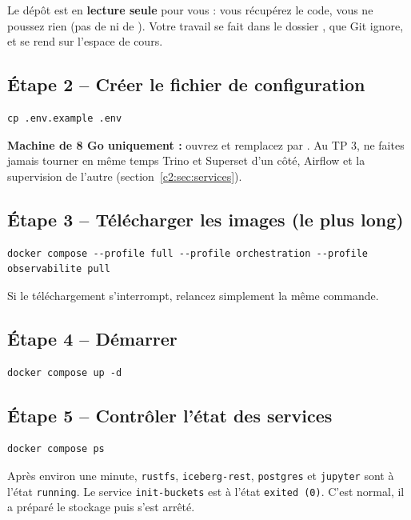 \begin{attention}
Le dépôt est en \textbf{lecture seule} pour vous : vous récupérez le code, vous ne poussez rien
(pas de  ni de ). Votre travail se fait dans le dossier
, que Git ignore, et se rend sur l'espace de cours.
\end{attention}

\subsection*{Étape 2 -- Créer le fichier de configuration}
\begin{lstlisting}[style=shell]
cp .env.example .env
\end{lstlisting}
\textbf{Machine de 8 Go uniquement :} ouvrez  et remplacez  par .
Au TP 3, ne faites jamais tourner en même temps Trino et Superset d'un côté, Airflow et la
supervision de l'autre (section~\ref{c2:sec:services}).

\subsection*{Étape 3 -- Télécharger les images (le plus long)}
\begin{lstlisting}[style=shell]
docker compose --profile full --profile orchestration --profile observabilite pull
\end{lstlisting}
Si le téléchargement s'interrompt, relancez simplement la même commande.

\subsection*{Étape 4 -- Démarrer}
\begin{lstlisting}[style=shell]
docker compose up -d
\end{lstlisting}

\subsection*{Étape 5 -- Contrôler l'état des services}
\begin{lstlisting}[style=shell]
docker compose ps
\end{lstlisting}

\begin{resultat}
Après environ une minute, \texttt{rustfs}, \texttt{iceberg-rest}, \texttt{postgres} et \texttt{jupyter}
sont à l'état \texttt{running}. Le service \texttt{init-buckets} est à l'état \texttt{exited (0)}.
C'est normal, il a préparé le stockage puis s'est arrêté.
\end{resultat}

